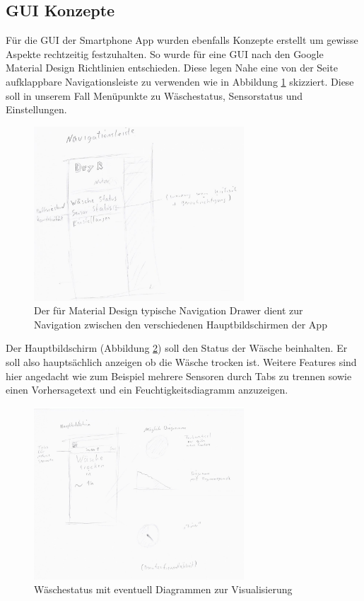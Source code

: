 \subsection{GUI Konzepte}
Für die GUI der Smartphone App wurden ebenfalls Konzepte erstellt um gewisse Aspekte rechtzeitig festzuhalten. So wurde für eine GUI nach den Google Material Design Richtlinien entschieden. Diese legen Nahe eine von der Seite aufklappbare Navigationsleiste zu verwenden wie in Abbildung \ref{gui_navdrawer} skizziert. Diese soll in unserem Fall Menüpunkte zu Wäschestatus, Sensorstatus und Einstellungen.
\begin{figure}[htb] 
	\centerline{\includegraphics*[width=0.7\textwidth]{./Designs/AppGUIConcept_navigationDrawer}}
	\caption{Der für Material Design typische Navigation Drawer dient zur Navigation zwischen den verschiedenen Hauptbildschirmen der App}
	\label{gui_navdrawer}
\end{figure}
Der Hauptbildschirm (Abbildung \ref{gui_laundry_status}) soll den Status der Wäsche beinhalten. Er soll also hauptsächlich anzeigen ob die Wäsche trocken ist. Weitere Features sind hier angedacht wie zum Beispiel mehrere Sensoren durch Tabs zu trennen sowie einen Vorhersagetext und ein Feuchtigkeitsdiagramm anzuzeigen.
\begin{figure}[htb] 
	\centerline{\includegraphics*[width=0.7\textwidth]{./Designs/AppGUIConcept_laundryStatus}}
	\caption{Wäschestatus mit eventuell Diagrammen zur Visualisierung}
	\label{gui_laundry_status}
\end{figure}
